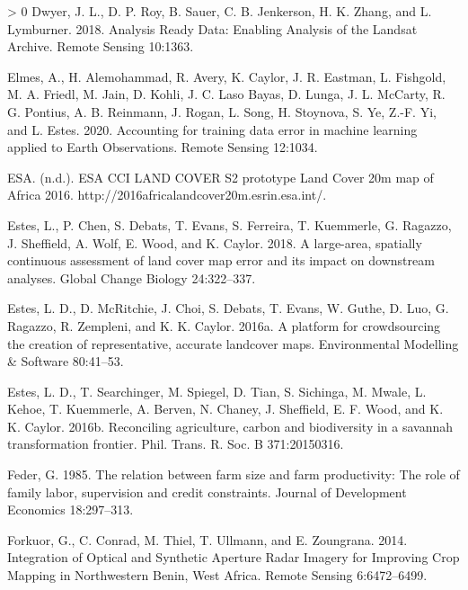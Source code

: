 \documentclass[11pt,a4paper]{article}
\newlength{\cslhangindent}
\newenvironment{CSLReferences}[3] %
 {%
  \setlength{\parindent}{0pt}
  \ifodd #1 \everypar{\setlength{\hangindent}{\cslhangindent}}\ignorespaces\fi
  \ifnum #2 > 0
  \setlength{\parskip}{#2\baselineskip}
  \fi
 }%
 {}
\begin{document}
\begin{CSLReferences}{1}{0}
\leavevmode\hypertarget{ref-DwyerAnalysisReadyData2018}{}%
Dwyer, J. L., D. P. Roy, B. Sauer, C. B. Jenkerson, H. K. Zhang, and L.
Lymburner. 2018. Analysis {Ready Data}: {Enabling Analysis} of the
{Landsat Archive}. Remote Sensing 10:1363.

\leavevmode\hypertarget{ref-ElmesAccountingtrainingdata2020}{}%
Elmes, A., H. Alemohammad, R. Avery, K. Caylor, J. R. Eastman, L.
Fishgold, M. A. Friedl, M. Jain, D. Kohli, J. C. Laso Bayas, D. Lunga,
J. L. McCarty, R. G. Pontius, A. B. Reinmann, J. Rogan, L. Song, H.
Stoynova, S. Ye, Z.-F. Yi, and L. Estes. 2020. Accounting for training
data error in machine learning applied to {Earth Observations}. Remote
Sensing 12:1034.

\leavevmode\hypertarget{ref-ESAESACCILAND}{}%
ESA. (n.d.). {ESA CCI LAND COVER} {} {S2} prototype {Land Cover} 20m map
of {Africa} 2016. http://2016africalandcover20m.esrin.esa.int/.

\leavevmode\hypertarget{ref-Esteslargeareaspatiallycontinuous2018}{}%
Estes, L., P. Chen, S. Debats, T. Evans, S. Ferreira, T. Kuemmerle, G.
Ragazzo, J. Sheffield, A. Wolf, E. Wood, and K. Caylor. 2018. A
large-area, spatially continuous assessment of land cover map error and
its impact on downstream analyses. Global Change Biology 24:322--337.

\leavevmode\hypertarget{ref-Estesplatformcrowdsourcingcreation2016}{}%
Estes, L. D., D. McRitchie, J. Choi, S. Debats, T. Evans, W. Guthe, D.
Luo, G. Ragazzo, R. Zempleni, and K. K. Caylor. 2016a. A platform for
crowdsourcing the creation of representative, accurate landcover maps.
Environmental Modelling \& Software 80:41--53.

\leavevmode\hypertarget{ref-EstesReconcilingagriculturecarbon2016}{}%
Estes, L. D., T. Searchinger, M. Spiegel, D. Tian, S. Sichinga, M.
Mwale, L. Kehoe, T. Kuemmerle, A. Berven, N. Chaney, J. Sheffield, E. F.
Wood, and K. K. Caylor. 2016b. Reconciling agriculture, carbon and
biodiversity in a savannah transformation frontier. Phil. Trans. R. Soc.
B 371:20150316.

\leavevmode\hypertarget{ref-federRelationFarmSize1985}{}%
Feder, G. 1985. The relation between farm size and farm productivity:
{The} role of family labor, supervision and credit constraints. Journal
of Development Economics 18:297--313.

\leavevmode\hypertarget{ref-forkuorIntegrationOpticalSynthetic2014}{}%
Forkuor, G., C. Conrad, M. Thiel, T. Ullmann, and E. Zoungrana. 2014.
Integration of {Optical} and {Synthetic Aperture Radar Imagery} for
{Improving Crop Mapping} in {Northwestern Benin}, {West Africa}. Remote
Sensing 6:6472--6499.


\end{CSLReferences}
\end{document}

